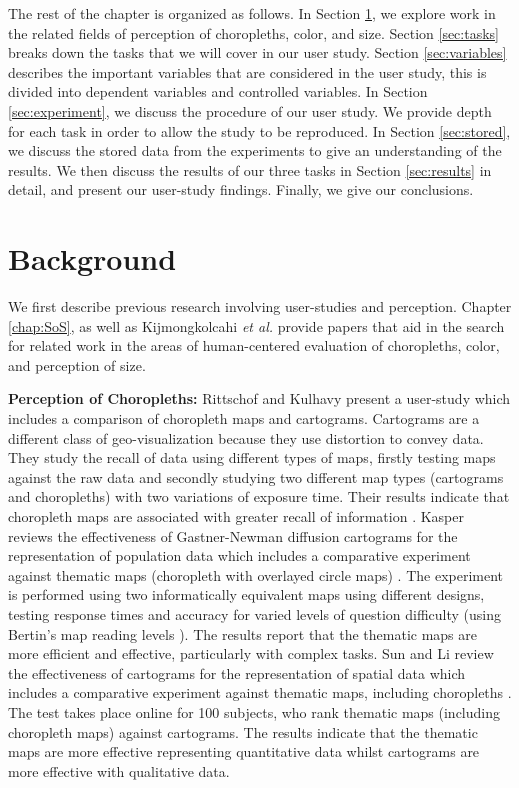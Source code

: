 The rest of the chapter is organized as follows. In Section \ref{sec:related}, we explore work in the related fields of perception of choropleths, color, and size. Section \ref{sec:tasks} breaks down the tasks that we will cover in our user study. Section \ref{sec:variables} describes the important variables that are considered in the user study, this is divided into dependent variables and controlled variables. In Section \ref{sec:experiment}, we discuss the procedure of our user study. We provide depth for each task in order to allow the study to be reproduced. In Section \ref{sec:stored}, we discuss the stored data from the experiments to give an understanding of the results. We then discuss the results of our three tasks in Section \ref{sec:results} in detail, and present our user-study findings. Finally, we give our conclusions. 

\section{Background} \label{sec:related}
We first describe previous research involving user-studies and perception. Chapter \ref{chap:SoS}, as well as Kijmongkolcahi \textit{et al.} \cite{kijmongkolchai2017empirically} provide papers that aid in the search for related work in the areas of human-centered evaluation of choropleths, color, and perception of size.

\textbf{Perception of Choropleths: }
Rittschof and Kulhavy present a user-study which includes a comparison of choropleth maps and cartograms. Cartograms are a different class of geo-visualization because they use distortion to convey data. They study the recall of data using different types of maps, firstly testing maps against the raw data and secondly studying two different map types (cartograms and choropleths) with two variations of exposure time.  Their results indicate that choropleth maps are associated with greater recall of information \cite{rittschof1998learning}. Kasper reviews the effectiveness of Gastner-Newman diffusion cartograms \cite{gastner2004diffusion} for the representation of population data which includes a comparative experiment against thematic maps (choropleth with overlayed circle maps) \cite{kaspar2011empirical}. The experiment is performed using two informatically equivalent maps using different designs, testing response times and accuracy for varied levels of question difficulty (using Bertin's map reading levels \cite{bertin1983semiology}). The results report that the thematic maps are more efficient and effective, particularly with complex tasks. Sun and Li review the effectiveness of cartograms for the representation of spatial data which includes a comparative experiment against thematic maps, including choropleths \cite{sun2010effectiveness}. The test takes place online for 100 subjects, who rank thematic maps (including choropleth maps) against cartograms. The results indicate that the thematic maps are more effective representing quantitative data whilst cartograms are more effective with qualitative data.

